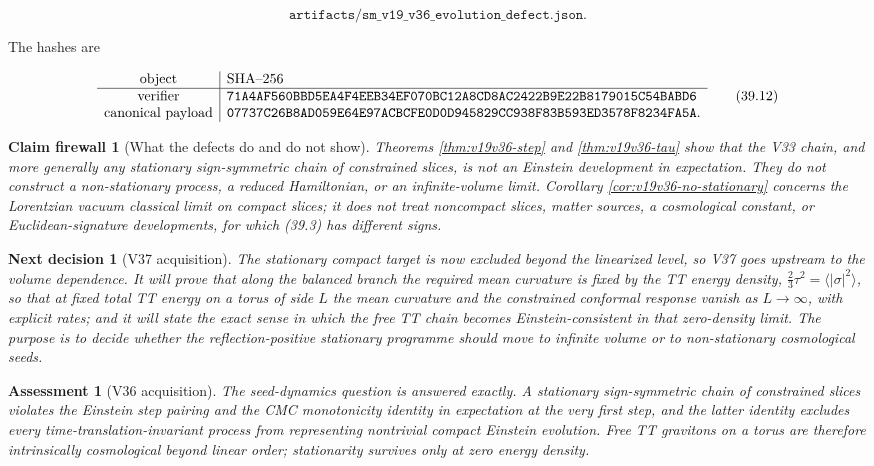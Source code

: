 \documentclass[11pt]{article}
\newtheorem{firewall}[theorem]{Claim firewall}
\newtheorem{decision}[theorem]{Next decision}
\newtheorem{assessment}[theorem]{Assessment}
\theoremstyle{remark}
\begin{document}
\[
 \texttt{artifacts/sm\_v19\_v36\_evolution\_defect.json}.          \tag{39.11}
\]

The hashes are

\[
\begin{array}{c|l}
\hbox{object}&\hbox{SHA--256}\\ \hline
\hbox{verifier}&
\texttt{71A4AF560BBD5EA4F4EEB34EF070BC12A8CD8AC2422B9E22B8179015C54BABD6}\\
\hbox{canonical payload}&
\texttt{07737C26B8AD059E64E97ACBCFE0D0D945829CC938F83B593ED3578F8234FA5A}.
\end{array}                                                     \tag{39.12}
\]

\begin{firewall}[What the defects do and do not show]
\label{fire:v19v36}
Theorems \ref{thm:v19v36-step} and \ref{thm:v19v36-tau} show that the
V33 chain, and more generally any stationary sign-symmetric chain of
constrained slices, is not an Einstein development in expectation.  They
do not construct a non-stationary process, a reduced Hamiltonian, or an
infinite-volume limit.  Corollary \ref{cor:v19v36-no-stationary}
concerns the Lorentzian vacuum classical limit on compact slices; it
does not treat noncompact slices, matter sources, a cosmological
constant, or Euclidean-signature developments, for which (39.3) has
different signs.
\end{firewall}

\begin{decision}[V37 acquisition]
\label{dec:v19v36-next}
The stationary compact target is now excluded beyond the linearized
level, so V37 goes upstream to the volume dependence.  It will prove
that along the balanced branch the required mean curvature is fixed by
the TT energy density, \(\tfrac23\tau^2=\langle|\sigma|^2\rangle\), so
that at fixed total TT energy on a torus of side \(L\) the mean
curvature and the constrained conformal response vanish as
\(L\to\infty\), with explicit rates; and it will state the exact sense in
which the free TT chain becomes Einstein-consistent in that
zero-density limit.  The purpose is to decide whether the
reflection-positive stationary programme should move to infinite volume
or to non-stationary cosmological seeds.
\end{decision}

\begin{assessment}[V36 acquisition]
\label{ass:v19v36}
The seed-dynamics question is answered exactly.  A stationary
sign-symmetric chain of constrained slices violates the Einstein step
pairing and the CMC monotonicity identity in expectation at the very
first step, and the latter identity excludes every time-translation-invariant
process from representing nontrivial compact Einstein evolution.  Free
TT gravitons on a torus are therefore intrinsically cosmological beyond
linear order; stationarity survives only at zero energy density.
\end{assessment}
\end{document}
